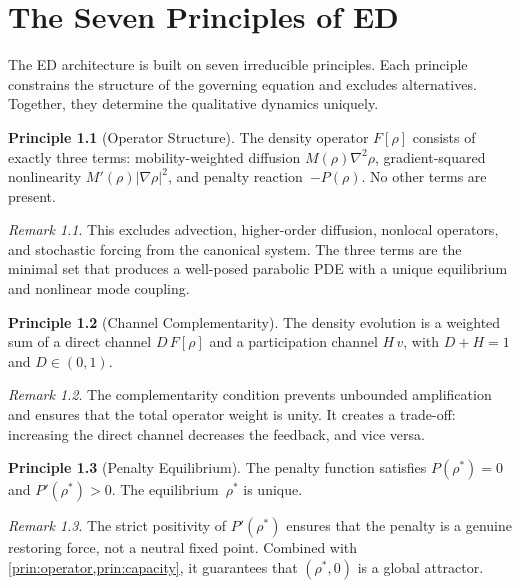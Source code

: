 \documentclass[11pt,twoside,openright]{book}
\theoremstyle{definition}
\theoremstyle{plain}
\theoremstyle{definition}
\newtheorem{principle}{Principle}[chapter]
\theoremstyle{remark}
\newtheorem{remark}{Remark}[chapter]
\newcommand{\rhostar}{\rho^{*}}
\newcommand{\Fop}{F[\rho]}
\begin{document}
\chapter{The Seven Principles of ED}\label{ch:principles}

The ED architecture is built on seven irreducible principles. Each principle constrains the structure of the governing equation and excludes alternatives. Together, they determine the qualitative dynamics uniquely.

\begin{principle}[Operator Structure]\label{prin:operator}
The density operator \(\Fop\) consists of exactly three terms: mobility-weighted diffusion \(M(\rho)\nabla^2\rho\), gradient-squared nonlinearity \(M'(\rho)|\nabla\rho|^2\), and penalty reaction~\(-P(\rho)\). No other terms are present.
\end{principle}

\begin{remark}\label{rem:prin1}
This excludes advection, higher-order diffusion, nonlocal operators, and stochastic forcing from the canonical system. The three terms are the minimal set that produces a well-posed parabolic PDE with a unique equilibrium and nonlinear mode coupling.
\end{remark}

\begin{principle}[Channel Complementarity]\label{prin:channels}
The density evolution is a weighted sum of a direct channel \(D\,\Fop\) and a participation channel \(H\,v\), with \(D + H = 1\) and \(D \in (0,1)\).
\end{principle}

\begin{remark}\label{rem:prin2}
The complementarity condition prevents unbounded amplification and ensures that the total operator weight is unity. It creates a trade-off: increasing the direct channel decreases the feedback, and vice versa.
\end{remark}

\begin{principle}[Penalty Equilibrium]\label{prin:penalty}
The penalty function satisfies \(P(\rhostar) = 0\) and \(P'(\rhostar) > 0\). The equilibrium~\(\rhostar\) is unique.
\end{principle}

\begin{remark}\label{rem:prin3}
The strict positivity of \(P'(\rhostar)\) ensures that the penalty is a genuine restoring force, not a neutral fixed point. Combined with \cref{prin:operator,prin:capacity}, it guarantees that \((\rhostar, 0)\) is a global attractor.
\end{remark}
\end{document}
